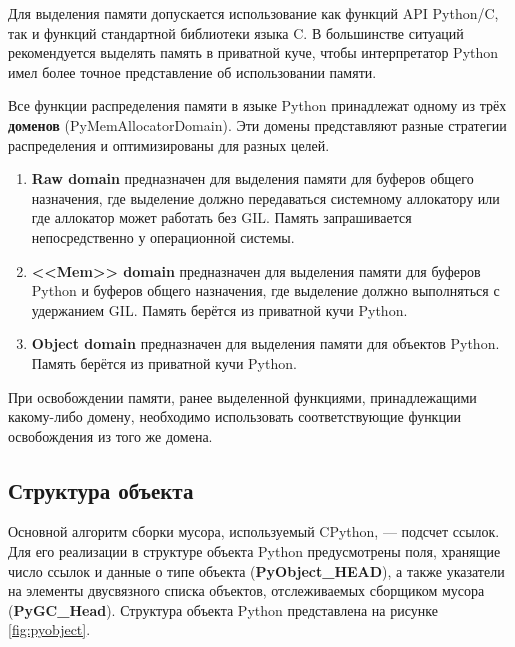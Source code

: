 Для выделения памяти допускается использование как функций API Python/C, так и функций стандартной библиотеки языка C. В большинстве ситуаций рекомендуется выделять память в приватной куче, чтобы интерпретатор Python имел более точное представление об использовании памяти. \cite{python_memory}

Все функции распределения памяти в языке Python принадлежат одному из трёх \textbf{доменов} (PyMemAllocatorDomain). Эти домены представляют разные стратегии распределения и оптимизированы для разных целей. \cite{python_memory}

\begin{enumerate}[label*=\arabic*.]
	\item \textbf{Raw domain} предназначен для выделения памяти для буферов общего назначения, где выделение должно передаваться системному аллокатору или где аллокатор может работать без GIL. Память запрашивается непосредственно у операционной системы.
	\item \textbf{<<Mem>> domain} предназначен для выделения памяти для буферов Python и буферов общего назначения, где выделение должно выполняться с удержанием GIL. Память берётся из приватной кучи Python.
	\item \textbf{Object domain} предназначен для выделения памяти для объектов Python. Память берётся из приватной кучи Python.
\end{enumerate}

При освобождении памяти, ранее выделенной функциями, принадлежащими какому-либо домену, необходимо использовать соответствующие функции освобождения из того же домена. \cite{python_memory}



\subsection{Структура объекта}

Основной алгоритм сборки мусора, используемый CPython, --- подсчет ссылок. Для его реализации в структуре объекта Python предусмотрены поля, хранящие число ссылок и данные о типе объекта (\textbf{PyObject\_HEAD}), а также указатели на элементы двусвязного списка объектов, отслеживаемых сборщиком мусора (\textbf{PyGC\_Head}). Структура объекта Python представлена на рисунке \ref{fig:pyobject}.~\cite{python_gc}

